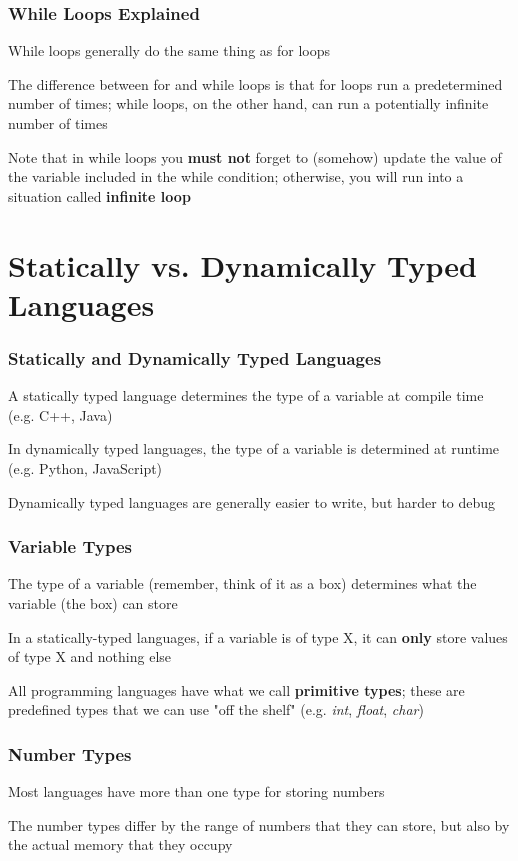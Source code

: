 \documentclass{beamer}
\begin{document}
\begin{frame}
\frametitle{While Loops Explained}
    While loops generally do the same thing as for loops
    \newline

    The difference between for and while loops is that for loops run a predetermined number of times; while loops, on the other hand, can run a potentially infinite number of times
    \newline

    Note that in while loops you \textbf{must not} forget to (somehow) update the value of the variable included in the while condition; otherwise, you will run into a situation called \textbf{infinite loop}
\end{frame}

\section{Statically vs. Dynamically Typed Languages}

\begin{frame}
\frametitle{Statically and Dynamically Typed Languages}
    A statically typed language determines the type of a variable at compile time (e.g. C++, Java)
    \newline

    In dynamically typed languages, the type of a variable is determined at runtime (e.g. Python, JavaScript)
    \newline

    Dynamically typed languages are generally easier to write, but harder to debug
\end{frame}

\begin{frame}
\frametitle{Variable Types}
    The type of a variable (remember, think of it as a box) determines what the variable (the box) can store
    \newline

    In a statically-typed languages, if a variable is of type X, it can \textbf{only} store values of type X and nothing else
    \newline

    All programming languages have what we call \textbf{primitive types}; these are predefined types that we can use "off the shelf" (e.g. \emph{int}, \emph{float}, \emph{char})
\end{frame}

\begin{frame}
\frametitle{Number Types}
    Most languages have more than one type for storing numbers
    \newline

    The number types differ by the range of numbers that they can store, but also by the actual memory that they occupy
\end{frame}
\end{document}
